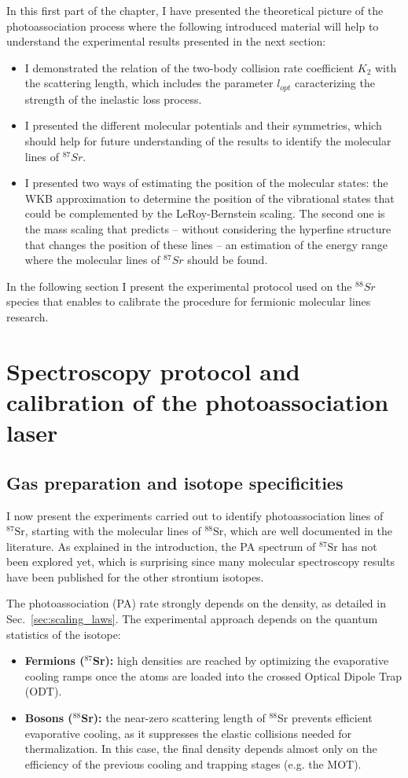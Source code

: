 In this first part of the chapter, I have presented the theoretical picture of the photoassociation process where the following introduced material will help to understand the experimental results presented in the next section:
\begin{itemize}
    \item I demonstrated the relation of the two-body collision rate coefficient $K_2$ with the scattering length, which includes the parameter $l_{opt}$ caracterizing the strength of the inelastic loss process.
    \item I presented the different molecular potentials and their symmetries, which should help for future understanding of the results to identify the molecular lines of $^{87}Sr$.
    \item I presented two ways of estimating the position of the molecular states: the WKB approximation to determine the position of the vibrational states that could be complemented by the LeRoy-Bernstein scaling.
    The second one is the mass scaling that predicts -- without considering the hyperfine structure that changes the position of these lines -- an estimation of the energy range where the molecular lines of $^{87}Sr$ should be found.
\end{itemize}

In the following section I present the experimental protocol used on the $^{88}Sr$ species that enables to calibrate the procedure for fermionic molecular lines research.
\section{Spectroscopy protocol and calibration of the photoassociation laser}

\subsection{Gas preparation and isotope specificities}
I now present the experiments carried out to identify photoassociation lines of $^{87}\text{Sr}$,
starting with the molecular lines of $^{88}\text{Sr}$, which are well documented in the literature.
As explained in the introduction, the PA spectrum of $^{87}\text{Sr}$ has not been explored yet,
which is surprising since many molecular spectroscopy results have been published for the other
strontium isotopes.

The photoassociation (PA) rate strongly depends on the density, as detailed in Sec.~\ref{sec:scaling_laws}.
The experimental approach depends on the quantum statistics of the isotope:
\begin{itemize}
    \item \textbf{Fermions ($^{87}$Sr):} high densities are reached by optimizing the evaporative cooling ramps once the atoms are loaded into the crossed Optical Dipole Trap (ODT).
    \item \textbf{Bosons ($^{88}$Sr):} the near-zero scattering length of $^{88}$Sr prevents efficient evaporative cooling, as it suppresses the elastic collisions needed for thermalization. In this case, the
    final density depends almost only on the efficiency of the previous cooling and trapping stages (e.g. the MOT).
\end{itemize}

